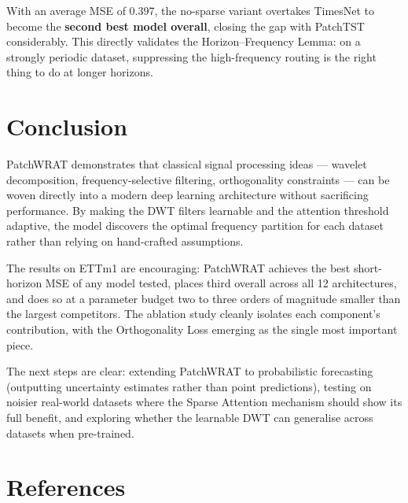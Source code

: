 \documentclass[11pt, letterpaper]{article}
\begin{document}
With an average MSE of 0.397, the no-sparse variant overtakes TimesNet to become the
\textbf{second best model overall}, closing the gap with PatchTST considerably. This directly
validates the Horizon--Frequency Lemma: on a strongly periodic dataset, suppressing the
high-frequency routing is the right thing to do at longer horizons.

\section{Conclusion}

PatchWRAT demonstrates that classical signal processing ideas — wavelet decomposition,
frequency-selective filtering, orthogonality constraints — can be woven directly into a
modern deep learning architecture without sacrificing performance. By making the DWT filters
learnable and the attention threshold adaptive, the model discovers the optimal frequency
partition for each dataset rather than relying on hand-crafted assumptions.

The results on ETTm1 are encouraging: PatchWRAT achieves the best short-horizon MSE of any
model tested, places third overall across all 12 architectures, and does so at a parameter
budget two to three orders of magnitude smaller than the largest competitors. The ablation
study cleanly isolates each component's contribution, with the Orthogonality Loss emerging
as the single most important piece.

The next steps are clear: extending PatchWRAT to probabilistic forecasting (outputting
uncertainty estimates rather than point predictions), testing on noisier real-world datasets
where the Sparse Attention mechanism should show its full benefit, and exploring whether the
learnable DWT can generalise across datasets when pre-trained.

\section*{References}
\end{document}
